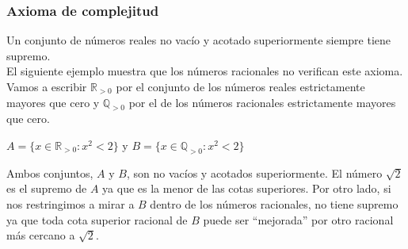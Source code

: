 \documentclass[Análisis.root.tex]{subfiles}
\newcommand{\Q}{\mathbb{Q}}
\newcommand{\R}{\mathbb{R}}
\begin{document}
        \subsubsection{Axioma de complejitud}
        Un conjunto de números reales no vacío y acotado superiormente siempre tiene supremo.\\
        El siguiente ejemplo muestra que los números racionales no verifican este axioma. Vamos a escribir \(\R_{>0}\) por el conjunto de los números reales estrictamente mayores que cero y \(\Q_{>0}\) por el de los números racionales estrictamente mayores que cero.
        \begin{center}
            \(A = \{x \in \R_{>0} : x^2 < 2\}\) y \(B = \{x \in \Q_{>0} : x^2 < 2\}\)
        \end{center}
        Ambos conjuntos, \(A\) y \(B\), son no vacíos y acotados superiormente. El número \(\sqrt{2}\) es el supremo de \(A\) ya que es la menor de las cotas superiores. Por otro lado, si nos restringimos a mirar a \(B\) dentro de los números racionales, no tiene supremo ya que toda cota superior racional de \(B\) puede ser “mejorada” por otro racional más cercano a \(\sqrt{2}\).
\end{document}
